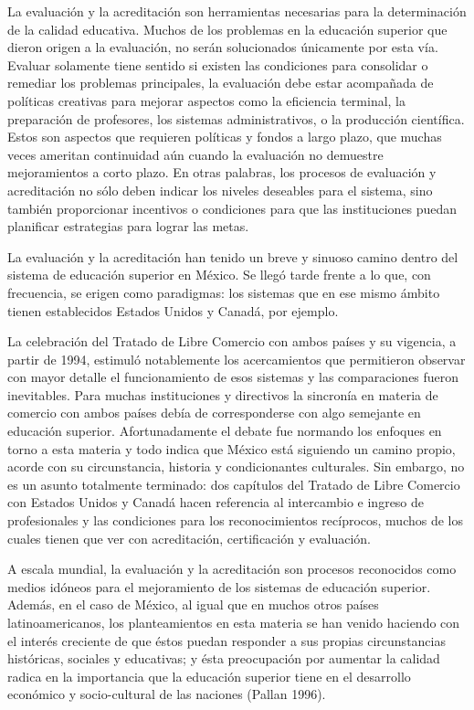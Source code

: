 \enlargethispage{1\baselineskip} 
La evaluación y la acreditación son herramientas necesarias para la
determinación de la calidad educativa. Muchos de los problemas en la
educación superior que dieron origen a la evaluación, no serán solucionados
 únicamente por esta vía. Evaluar solamente tiene sentido si existen las
condiciones para consolidar o remediar los problemas principales, la
evaluación debe estar acompañada de políticas creativas para mejorar
aspectos como la eficiencia terminal, la preparación de profesores, los
sistemas administrativos, o la producción científica. Estos son aspectos
que requieren políticas y fondos a largo plazo, que muchas veces ameritan
continuidad aún cuando la evaluación no demuestre mejoramientos a corto
plazo. En otras palabras, los procesos de evaluación y acreditación no sólo
deben indicar los niveles deseables para el sistema, sino también
proporcionar incentivos o condiciones para que las instituciones puedan
planificar estrategias para lograr las metas.

La evaluación y la acreditación han tenido un breve y sinuoso camino dentro del sistema de
educación superior en México. Se llegó tarde frente a lo que, con
frecuencia, se erigen como paradigmas: los sistemas que en ese mismo ámbito
tienen establecidos Estados Unidos y Canadá, por ejemplo.

La celebración del Tratado de Libre Comercio con ambos países y su vigencia, 
a partir de 1994, estimuló notablemente los acercamientos que permitieron observar 
con mayor detalle el funcionamiento de esos sistemas y las comparaciones fueron
inevitables. Para muchas instituciones y directivos la sincronía en materia
de comercio con ambos países debía de corresponderse con algo semejante en
educación superior. Afortunadamente el debate fue normando los enfoques en
torno a esta materia y todo indica que México está siguiendo un camino
propio, acorde con su circunstancia, historia y condicionantes culturales.
Sin embargo, no es un asunto totalmente terminado: dos capítulos del
Tratado de Libre Comercio con Estados Unidos y Canadá hacen referencia al
intercambio e ingreso de profesionales y las condiciones para los
reconocimientos recíprocos, muchos de los cuales tienen que ver con
acreditación, certificación y evaluación.
\enlargethispage{1\baselineskip}
 
A escala mundial, la
evaluación y la acreditación son procesos reconocidos como medios idóneos
para el mejoramiento de los sistemas de educación superior. Además, en el
caso de México, al igual que en muchos otros países latinoamericanos, los
planteamientos en esta materia se han venido haciendo con el interés
creciente de que éstos puedan responder a sus
propias circunstancias históricas, sociales y educativas; y ésta preocupación 
por aumentar la calidad radica en la importancia que la educación superior tiene en el
desarrollo económico y socio-cultural de las
naciones (Pallan 1996).
\newpage

